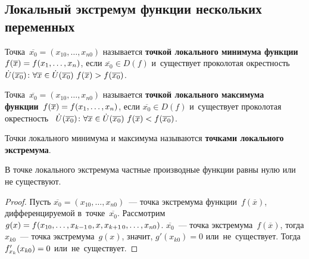 \subsection{Локальный экстремум функции нескольких переменных}
\begin{definition}
	Точка~$\overline{x_0} = (x_{10}, \ldots, x_{n0})$ называется \textbf{точкой локального минимума функции}~$f(\overline x) \opbr= f(x_1, \ldots, x_n)$,
	если $\overline{x_0} \in D(f)$ и~существует проколотая окрестность~
	$\dot U(\overline{x_0}) \colon
	\forall \overline x \in \dot U(\overline{x_0}) \ \allowbreak
	f(\overline x) \opbr> f(\overline{x_0})$.
	
	Точка~$\overline{x_0} = (x_{10}, \ldots, x_{n0})$ называется \textbf{точкой локального максимума функции}~$f(\overline x) \opbr= f(x_1, \ldots, \allowbreak x_n)$,
	если $\overline{x_0} \in D(f)$ и~существует проколотая окрестность~
	$\dot U(\overline{x_0}) \colon
	\forall \overline x \in \dot U(\overline{x_0}) \ \allowbreak
	f(\overline x) \opbr< f(\overline{x_0})$.
\end{definition}

\begin{definition}
	Точки локального минимума и максимума называются \textbf{точками локального экстремума}.
\end{definition}
	
\begin{theorem}
	В точке локального экстремума частные производные функции равны нулю или не существуют.
\end{theorem}
\begin{proof}
	Пусть $\overline{x_0} = (x_{10}, \ldots, x_{n0})$~--- точка экстремума функции~$f(\overline x)$, дифференцируемой в~точке~$\overline{x_0}$.
	Рассмотрим
	$g(x) \opbr= f(x_{10}, \ldots, \allowbreak x_{k-1\,0}, x, x_{k+1\,0}, \ldots, \allowbreak x_{n0})$.
	$\overline{x_0}$~--- точка экстремума~$f(\overline x)$, тогда $x_{k0}$~--- точка экстремума~$g(x)$, значит, $g'(x_{k0}) = 0$ или~не~существует.
	Тогда $f_{x_k}'(x_{k0}) \opbr= 0$ или~не~существует.
\end{proof}

